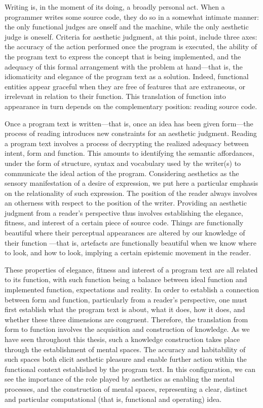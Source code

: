 Writing is, in the moment of its doing, a broadly personal act. When a programmer writes some source code, they do so in a somewhat intimate manner: the only functional judges are onself and the machine, while the only aesthetic judge is oneself. Criteria for aesthetic judgment, at this point, include three axes: the accuracy of the action performed once the program is executed, the ability of the program text to express the concept that is being implemented, and the adequacy of this formal arrangement with the problem at hand—that is, the idiomaticity and elegance of the program text as a solution. Indeed, functional entities appear graceful when they are free of features that are extraneous, or irrelevant in relation to their function. This translation of function into appearance in turn depends on the complementary position: reading source code.

Once a program text is written—that is, once an idea has been given form—the process of reading introduces new constraints for an aesthetic judgment. Reading a program text involves a process of decrypting the realized adequacy between intent, form and function. This amounts to identifying the semantic affordances, under the form of structure, syntax and vocabulary used by the writer(s) to communicate the ideal action of the program. Considering aesthetics as the sensory manifestation of a desire of expression, we put here a particular emphasis on the relationality of such expression. The position of the reader always involves an otherness with respect to the position of the writer. Providing an aesthetic judgment from a reader's perspective thus involves establishing the elegance, fitness, and interest of a certain piece of source code. Things are functionally beautiful where their perceptual appearances are altered by our knowledge of their function \citep{parsons_functional_2012}—that is, artefacts are functionally beautiful when we know where to look, and how to look, implying a certain epistemic movement in the reader.

These properties of elegance, fitness and interest of a program text are all related to its function, with such function being a balance between ideal function and implemented function, expectations and reality. In order to establish a connection between form and function, particularly from a reader's perspective, one must first establish what the program text is about, what it does, how it does, and whether these three dimensions are congruent. Therefore, the translation from form to function involves the acquisition and construction of knowledge. As we have seen throughout this thesis, such a knowledge construction takes place through the establishment of mental spaces. The accuracy and habitability of such spaces both elicit aesthetic pleasure and enable further action within the functional context established by the program text. In this configuration, we can see the importance of the role played by aesthetics as enabling the mental processes, and the construction of mental spaces, representing a clear, distinct and particular computational (that is, functional and operating) idea.

